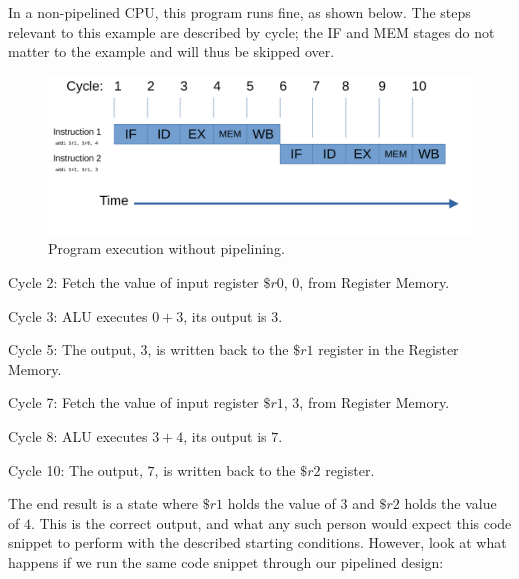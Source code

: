 \documentclass[12pt,twoside]{reedthesis}
\begin{document}
In a non-pipelined CPU, this program runs fine, as shown below. The steps relevant to this example are described by cycle; the IF and MEM stages do not matter to the example and will thus be skipped over.


\begin{figure}[h!]

	\centering
	\includegraphics[scale=0.7]{nopipeline}
	\caption{Program execution without pipelining.}
	\label{no-pipeline}
\end{figure}

Cycle 2: Fetch the value of input register $\$r0$, $0$, from Register Memory.

Cycle 3: ALU executes $0 + 3$, its output is $3$.

Cycle 5: The output, $3$, is written back to the $\$r1$ register in the Register Memory.

Cycle 7: Fetch the value of input register $\$r1$, $3$, from Register Memory.

Cycle 8: ALU executes $3 + 4$, its output is $7$.

Cycle 10: The output, $7$, is written back to the $\$r2$ register.

\vspace{5mm}

The end result is a state where $\$r1$ holds the value of $3$ and $\$r2$ holds the value of $4$. This is the correct output, and what any such person would expect this code snippet to perform with the described starting conditions. However, look at what happens if we run the same code snippet through our pipelined design:
\end{document}
